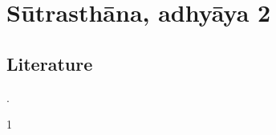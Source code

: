      \section{Sūtrasthāna, adhyāya 2}


\subsection{Literature}
\cites[IA, 204]{meul-hist}{prei-2007}[82--83, \emph{et passim}]{wujad-2012}. 

\begin{translation}    
    \item [1] 
    
\end{translation}



